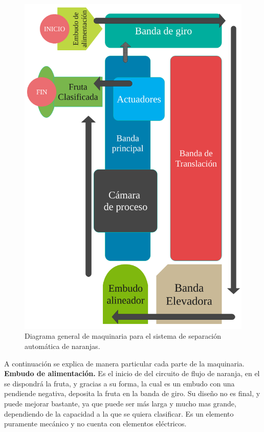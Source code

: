 \documentclass[twoside,spanish,ESP,MSc]{plantillaLabUPV}
\theoremstyle{definition}
\begin{document}
\begin{figure}[h]
	\centering
	\includegraphics[scale=0.3]{edrawimas/diagramamaquina}
	\caption{Diagrama general de maquinaria para el sistema de separación automática de naranjas.}
	\label{fig:diagramamaquina}
\end{figure}

A continuación se explica de manera particular cada parte de la maquinaria.\\

\checkmark\textbf{Embudo de alimentación.} Es el inicio de del circuito de flujo de naranja, en el se dispondrá la fruta, y gracias a su forma, la cual es un embudo con una pendiende negativa, deposita la fruta en la banda de giro. Su diseño no es final, y puede mejorar bastante, ya que puede ser más larga y mucho mas grande, dependiendo de la capacidad a la que se quiera clasificar. Es un elemento puramente mecánico y no cuenta con elementos eléctricos.%
\end{document}
